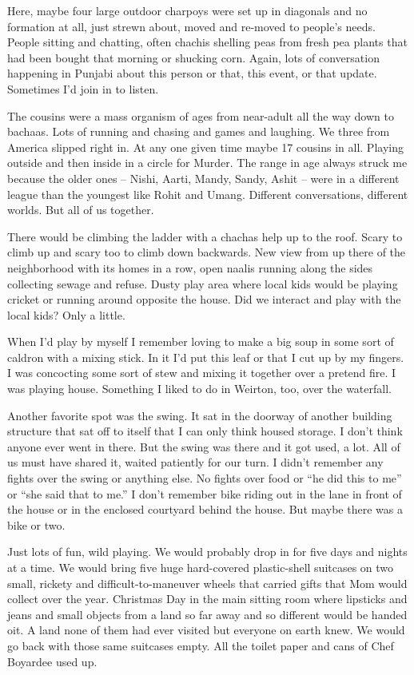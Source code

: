Here, maybe four large outdoor charpoys were set up in diagonals and no formation at all, just strewn about, moved and re-moved to people’s needs. People sitting and chatting, often chachis shelling peas from fresh pea plants that had been bought that morning or shucking corn. Again, lots of conversation happening in Punjabi about this person or that, this event, or that update. Sometimes I’d join in to listen.

The cousins were a mass organism of ages from near-adult all the way down to bachaas. Lots of running and chasing and games and laughing. We three from America slipped right in. At any one given time maybe 17 cousins in all. Playing outside and then inside in a circle for Murder. The range in age always struck me because the older ones – Nishi, Aarti, Mandy, Sandy, Ashit – were in a different league than the youngest like Rohit and Umang. Different conversations, different worlds. But all of us together.

There would be climbing the ladder with a chachas help up to the roof. Scary to climb up and scary too to climb down backwards. New view from up there of the neighborhood with its homes in a row, open naalis running along the sides collecting sewage and refuse. Dusty play area where local kids would be playing cricket or running around opposite the house. Did we interact and play with the local kids? Only a little.

When I’d play by myself I remember loving to make a big soup in some sort of caldron with a mixing stick. In it I’d put this leaf or that I cut up by my fingers. I was concocting some sort of stew and mixing it together over a pretend fire. I was playing house. Something I liked to do in Weirton, too, over the waterfall.

Another favorite spot was the swing. It sat in the doorway of another building structure that sat off to itself that I can only think housed storage. I don’t think anyone ever went in there. But the swing was there and it got used, a lot. All of us must have shared it, waited patiently for our turn. I didn’t remember any fights over the swing or anything else. No fights over food or “he did this to me” or “she said that to me.” I don’t remember bike riding out in the lane in front of the house or in the enclosed courtyard behind the house. But maybe there was a bike or two.

Just lots of fun, wild playing. We would probably drop in for five days and nights at a time. We would bring five huge hard-covered plastic-shell suitcases on two small, rickety and difficult-to-maneuver wheels that carried gifts that Mom would collect over the year. Christmas Day in the main sitting room where lipsticks and jeans and small objects from a land so far away and so different would be handed oit. A land none of them had ever visited but everyone on earth knew. We would go back with those same suitcases empty. All the toilet paper and cans of Chef Boyardee used up.

